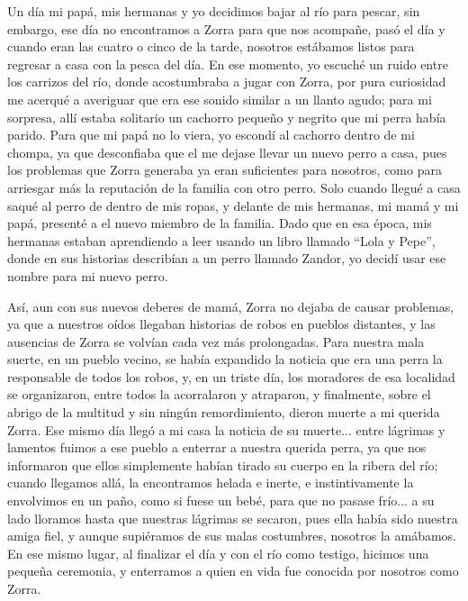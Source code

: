 Un día mi papá, mis hermanas y yo decidimos bajar al río para pescar, sin embargo, ese día no encontramos a Zorra para que nos acompañe, pasó el día y cuando eran las cuatro o cinco de la tarde, nosotros estábamos listos para regresar a casa con la pesca del día. En ese momento, yo escuché un ruido entre los carrizos del río, donde acostumbraba a jugar con Zorra, por pura curiosidad me acerqué a averiguar que era ese sonido similar a un llanto agudo; para mi sorpresa, allí estaba solitario un cachorro pequeño y negrito que mi perra había parido.
Para que mi papá no lo viera, yo escondí al cachorro dentro de mi chompa, ya que desconfiaba que el me dejase llevar un nuevo perro a casa, pues los problemas que Zorra generaba ya eran suficientes para nosotros, como para arriesgar más la reputación de la familia con otro perro.
Solo cuando llegué a casa saqué al perro de dentro de mis ropas, y delante de mis hermanas, mi mamá y mi papá, presenté a el nuevo miembro de la familia. Dado que en esa época, mis hermanas estaban aprendiendo a leer usando un libro llamado ``Lola y Pepe'', donde en sus historias describían a un perro llamado Zandor, yo decidí usar ese nombre para mi nuevo perro.

Así, aun con sus nuevos deberes de mamá, Zorra no dejaba de causar problemas, ya que a nuestros oídos llegaban historias de robos en pueblos distantes, y las ausencias de Zorra se volvían cada vez más prolongadas.
Para nuestra mala suerte, en un pueblo vecino, se había expandido la noticia que era una perra la responsable de todos los robos, y, en un triste día, los moradores de esa localidad se organizaron, entre todos la acorralaron y atraparon, y finalmente, sobre el abrigo de la multitud y sin ningún remordimiento, dieron muerte a mi querida Zorra. 
Ese mismo día llegó a mi casa la noticia de su muerte... entre lágrimas y lamentos fuimos a ese pueblo a enterrar a nuestra querida perra, ya que nos informaron que ellos simplemente habían tirado su cuerpo en la ribera del río; cuando llegamos allá, la encontramos helada e inerte, e instintivamente la envolvimos en un paño, como si fuese un bebé, para que no pasase frío... a su lado lloramos hasta que nuestras lágrimas se secaron, pues ella había sido nuestra amiga fiel, y aunque supiéramos de sus malas costumbres, nosotros la amábamos.
En ese mismo lugar, al finalizar el día y con el río como testigo, hicimos una pequeña ceremonia, y enterramos a quien en vida fue conocida por nosotros como Zorra.

